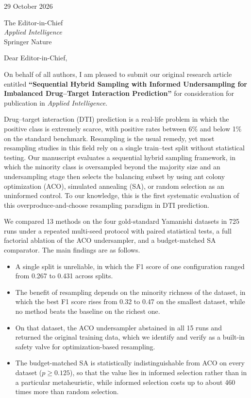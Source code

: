 \documentclass[11pt,a4paper]{article}
\begin{document}
\begin{flushright}
29 October 2026
\end{flushright}

The Editor-in-Chief\\
\emph{Applied Intelligence}\\
Springer Nature

Dear Editor-in-Chief,

On behalf of all authors, I am pleased to submit our original research
article entitled \textbf{``Sequential Hybrid Sampling with Informed
Undersampling for Imbalanced Drug--Target Interaction Prediction''} for
consideration for publication in \emph{Applied Intelligence}.

Drug--target interaction (DTI) prediction is a real-life problem in which
the positive class is extremely scarce, with positive rates between 6\%
and below 1\% on the standard benchmark. Resampling is the usual remedy,
yet most resampling studies in this field rely on a single train--test
split without statistical testing. Our manuscript evaluates a sequential
hybrid sampling framework, in which the minority class is oversampled
beyond the majority size and an undersampling stage then selects the
balancing subset by using ant colony optimization (ACO), simulated
annealing (SA), or random selection as an uninformed control. To our
knowledge, this is the first systematic evaluation of this
overproduce-and-choose resampling paradigm in DTI prediction.

We compared 13 methods on the four gold-standard Yamanishi datasets in
725 runs under a repeated multi-seed protocol with paired statistical
tests, a full factorial ablation of the ACO undersampler, and a
budget-matched SA comparator. The main findings are as follows.
\begin{itemize}[nosep]
  \item A single split is unreliable, in which the F1 score of one
        configuration ranged from 0.267 to 0.431 across splits.
  \item The benefit of resampling depends on the minority richness of the
        dataset, in which the best F1 score rises from 0.32 to 0.47 on the
        smallest dataset, while no method beats the baseline on the
        richest one.
  \item On that dataset, the ACO undersampler abstained in all 15 runs and
        returned the original training data, which we identify and verify
        as a built-in safety valve for optimization-based resampling.
  \item The budget-matched SA is statistically indistinguishable from ACO
        on every dataset ($p \geq 0.125$), so that the value lies in
        informed selection rather than in a particular metaheuristic,
        while informed selection costs up to about 460 times more than
        random selection.
\end{itemize}
\end{document}
